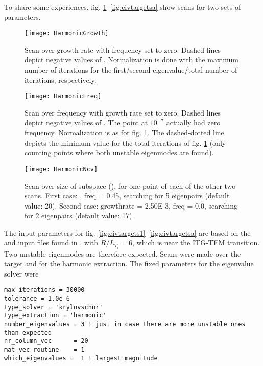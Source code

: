 To share some experiences, fig. \ref{fig:eivharmonicgrowth}--\ref{fig:eivtargetsa} 
show scans for two sets of parameters.
\begin{figure}[htp!]
  \begin{center}
    \texttt{[image: HarmonicGrowth]}
    \caption{\label{fig:eivharmonicgrowth} Scan over growth rate with
    frequency set to zero. Dashed lines depict negative values of
    . Normalization is done with the maximum number of
    iterations for the first/second eigenvalue/total number of iterations,
    respectively.}
  \end{center}
\end{figure}
\begin{figure}[htp!]
  \begin{center}
    \texttt{[image: HarmonicFreq]}
    \caption{\label{fig:eivharmonicfreq} Scan over frequency with growth rate
      set to zero. Dashed lines depict negative values of . The
      point at $10^{-7}$ actually had zero frequency. Normalization is as for
      fig. \ref{fig:eivharmonicgrowth}. The dashed-dotted line depicts the
      minimum value for the total iterations of fig. \ref{fig:eivharmonicgrowth}
      (only counting points where both unstable eigenmodes are found).}
  \end{center}
\end{figure}
\begin{figure}[htp!]
  \begin{center}
    \texttt{[image: HarmonicNcv]}
    \caption{\label{fig:eivharmonicncv} Scan over size of subspace  (), for one
    point of each of the other two scans. First case: ,
    freq = 0.45, searching for 5 eigenpairs (default value: 20). Second case: growthrate = 2.50E-3,
    freq = 0.0, searching for 2 eigenpairs (default value: 17).}
  \end{center}
\end{figure}

The input parameters for fig. \ref{fig:eivtargets1}--\ref{fig:eivtargetsa} are
based on the  and  input files found in
, with $R/L_{T_i} = 6$, which is near the ITG-TEM transition.
Two unstable eigenmodes are therefore expected.
Scans were made over the target  and  for the harmonic extraction.
The fixed parameters for the eigenvalue solver were
\begin{verbatim}
max_iterations = 30000
tolerance = 1.0e-6
type_solver = 'krylovschur'
type_extraction = 'harmonic'
number_eigenvalues = 3 ! just in case there are more unstable ones than expected
nr_column_vec      = 20
mat_vec_routine    = 1
which_eigenvalues =  1 ! largest magnitude
\end{verbatim}

